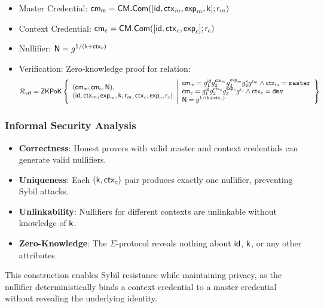\begin{itemize}
    \item Master Credential: $\mathsf{cm_m} = \mathsf{CM.Com}([\mathsf{id}, \mathsf{ctx}_m, \mathsf{exp}_m, \mathsf{k}]; \mathsf{r}_m)$ 
    \item Context Credential: $\mathsf{cm_c} = \mathsf{CM.Com}([\mathsf{id}, \mathsf{ctx}_c, \mathsf{exp}_c]; \mathsf{r}_c)$
    \item Nullifier: $\mathsf{N} = g^{1/(\mathsf{k} + \mathsf{ctx}_c)}$
    \item Verification: Zero-knowledge proof for relation:
    \[
    \mathcal{R}_{\mathsf{vrf}} = {\mathsf{ZKPoK}} \left\{ 
    \begin{array}{l} 
    (\mathsf{cm_m}, \mathsf{cm_c}, \mathsf{N}), \\
    (\mathsf{id}, \mathsf{ctx}_m, \mathsf{exp}_m, \mathsf{k}, \mathsf{r}_m, \mathsf{ctx}_c, \mathsf{exp}_c, \mathsf{r}_c) \\
    \end{array} 
    \middle|
    \begin{array}{l}
        \mathsf{cm_m} = g_1^{\mathsf{id}}g_2^{\mathsf{ctx}_m}g_3^{\mathsf{exp}_m}g_4^{\mathsf{k}}g^{\mathsf{r}_m}  \wedge \mathsf{ctx}_m=\texttt{master} \\
        \mathsf{cm_c} = g_1^{\mathsf{id}}g_2^{\mathsf{ctx}_c}g_3^{\mathsf{exp}_c}g^{\mathsf{r}_c} \wedge \mathsf{ctx}_c=\texttt{dmv} \\
        \mathsf{N} = g^{1/(\mathsf{k} + \mathsf{ctx}_c)}
    \end{array} 
    \right\}
    \]
\end{itemize}

\subsubsection{Informal Security Analysis}
\begin{itemize}
    \item \textbf{Correctness}: Honest provers with valid master and context credentials can generate valid nullifiers.
    \item \textbf{Uniqueness}: Each $(\mathsf{k},\mathsf{ctx}_c)$ pair produces exactly one nullifier, preventing Sybil attacks.
    \item \textbf{Unlinkability}: Nullifiers for different contexts are unlinkable without knowledge of $\mathsf{k}$.
    \item \textbf{Zero-Knowledge}: The $\Sigma$-protocol reveals nothing about $\mathsf{id}$, $\mathsf{k}$, or any other attributes.
\end{itemize}

This construction enables Sybil resistance while maintaining privacy, as the nullifier deterministically binds a context credential to a master credential without revealing the underlying identity.













